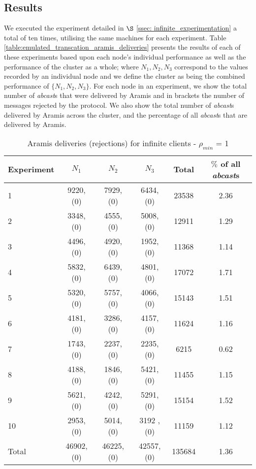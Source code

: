     \subsection{Results}
We executed the experiment detailed in $\S$ \ref{ssec: infinite_experimentation} a total of ten times, utilising the same machines for each experiment.  Table \ref{table:emulated_transcation_aramis_deliveries} presents the results of each of these experiments based upon each node's individual performance as well as the performance of the cluster as a whole; where $N_1, N_2, N_3$ correspond to the values recorded by an individual node and we define the cluster as being the combined performance of $\{N_1,N_2,N_3\}$.  For each node in an experiment, we show the total number of \emph{abcast}s that were delivered by \textsf{Aramis} and in brackets the number of messages rejected by the protocol.  We also show the total number of \emph{abcast}s delivered by \textsf{Aramis} across the cluster, and the percentage of all \emph{abcast}s that are delivered by \textsf{Aramis}.  
    
\begin{table}[p]
  \begin{center}
  \renewcommand{\arraystretch}{1.3}
   \begin{tabular}{|l|c|c|c|c|c|}
    \hline
    Experiment & $N_1$ & $N_2$       & $N_3$      & Total    & $\%$ of all \emph{abcast}s \\ \hline \hline
    1          & 9220, (0)  & 7929, (0)  & 6434, (0)  & 23538 & 2.36 \\ \hline
    2          & 3348, (0)  & 4555, (0)  & 5008, (0)  & 12911 & 1.29 \\ \hline
    3          & 4496, (0)  & 4920, (0)  & 1952, (0)  & 11368 & 1.14 \\ \hline
    4          & 5832, (0)  & 6439, (0)  & 4801, (0)  & 17072 & 1.71 \\ \hline
    5          & 5320, (0)  & 5757, (0)  & 4066, (0)  & 15143 & 1.51 \\ \hline
    6          & 4181, (0)  & 3286, (0)  & 4157, (0)  & 11624 & 1.16 \\ \hline
    7          & 1743, (0)  & 2237, (0)  & 2235, (0)  & 6215   & 0.62 \\ \hline
    8          & 4188, (0)  & 1846, (0)  & 5421, (0)  & 11455 & 1.15 \\ \hline
    9          & 5621, (0)  & 4242, (0)  & 5291, (0)  & 15154 & 1.52 \\ \hline
    10        & 2953, (0)  & 5014, (0)  & 3192 , (0) & 11159 & 1.12 \\ \hline \hline
    Total    &46902, (0) &46225, (0) &42557, (0) &135684 & 1.36\\ \hline
    \end{tabular}
    \caption{Aramis deliveries (rejections) for infinite clients - $\rho_{min}$ = 1}
    \label{table:infinite_clients_rejections}
  \end{center}
\end{table}
    
